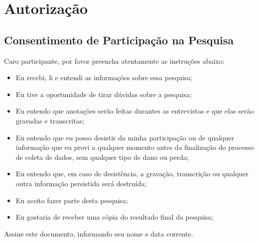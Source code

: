\chapter{Autorização}
\label{ape:autorizacao}

\section{Consentimento de Participação na Pesquisa}

Caro participante, por favor preencha atentamente as instruções abaixo:

\begin{itemize}
  \item Eu recebi, li e entendi as informações sobre essa pesquisa;
  \item Eu tive a oportunidade de tirar dúvidas sobre a pesquisa;
  \item Eu entendo que anotações serão feitas durantes as entrevistas e que
  elas serão gravadas e transcritas;
  \item Eu entendo que eu posso desistir da minha participação ou de
  qualquer informação que eu provi a qualquer momento antes da finalização do processo de
  coleta de dados, sem qualquer tipo de dano ou perda;
  \item Eu entendo que, em caso de desistência, a gravação, transcrição ou
  qualquer outra informação persistida será destruída;
  \item Eu aceito fazer parte desta pesquisa;
  \item Eu gostaria de receber uma cópia do resultado final da pesquisa;
\end{itemize}

Assine este documento, informando seu nome e data corrente.